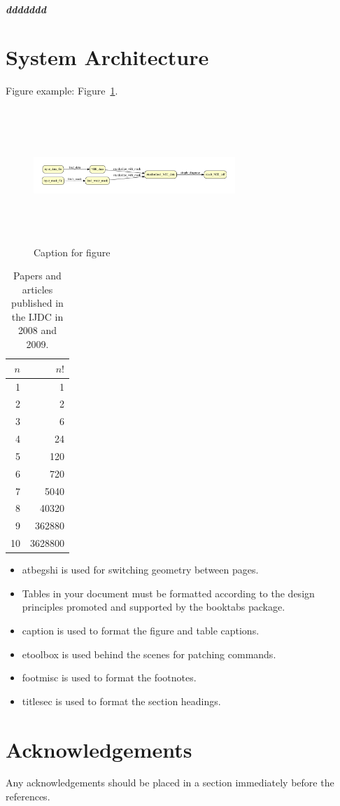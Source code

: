 \documentclass[practice]{ijdc-v9}
\begin{document}
\subparagraph{ddddddd}

\section{System Architecture}

Figure example:   Figure~\ref{fig:start-paper}.

\begin{figure}[h]
    \centering
    \includegraphics[width=3.0in, height=2in]{image1.pdf}
    \caption{Caption for figure}
    \label{fig:start-paper}
\end{figure}


\begin{table}
\caption{Papers and articles published in the IJDC in 2008 and 2009.} 
\label{tab:issues} 
\centering\small 
\begin{tabular}{|r|r|}
\hline
$n$&$n!$\\
\hline
1&1\\
2&2\\
3&6\\
4&24\\
5&120\\
6&720\\
7&5040\\
8&40320\\
9&362880\\
10&3628800\\
\hline
\end{tabular}\end{table}



\begin{itemize}
\item\textsf{atbegshi} is used for switching geometry between pages.
\item Tables in your document must be formatted according to the design principles promoted and supported by the \textsf{booktabs} package.
\item\textsf{caption} is used to format the figure and table captions.
\item\textsf{etoolbox} is used behind the scenes for patching commands.
\item\textsf{footmisc} is used to format the footnotes.
\item\textsf{titlesec} is used to format the section headings.
\end{itemize}





\section{Acknowledgements}

Any acknowledgements should be placed in a section immediately before the references.\nocite{*}

\printbibliography
%
\end{document}
